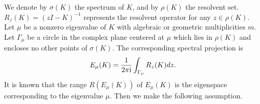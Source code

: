 \documentclass[leqno,CJK]{siamltex704}
\numberwithin{equation}{section}
\begin{document}
	We denote by $\sigma(K)$ the spectrum of $K$, and by $\rho(K)$ the
	resolvent set. $R_z(K)=(zI-K)^{-1}$ represents the resolvent
	operator for any $z\in\rho(K)$. Let $\mu$ be a nonzero eigenvalue of $K$ with algebraic
	or geometric
	multiplicities $m$. Let $\Gamma_\mu$ be a circle in the complex plane
	centered at $\mu$ which lies in $\rho(K)$ and encloses no other
	points of $\sigma(K)$. The corresponding spectral projection is
	\begin{eqnarray*}
		E_\mu(K)=\frac{1}{2\pi {\rm i}}\int_{\Gamma_\mu} R_z(K) dz.
	\end{eqnarray*}
	It is known that the range $R(E_\mu(K))$ of $E_\mu(K)$ is the eigenspace corresponding to the eigenvalue $\mu$. Then we make the following assumption.
	

\end{document}

